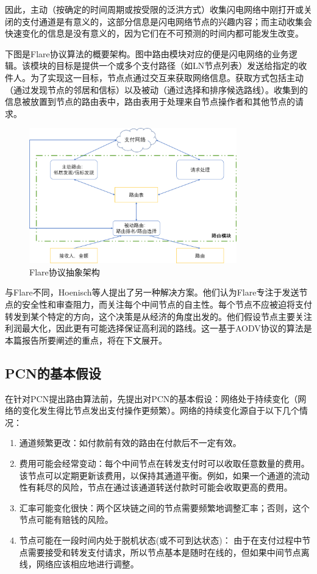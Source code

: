 \documentclass[12pt,a4paper]{article}
\begin{document}
因此，主动（按确定的时间周期或按受限的泛洪方式）收集闪电网络中刚打开或关闭的支付通道是有意义的，这部分信息是闪电网络节点的兴趣内容；而主动收集会快速变化的信息是没有意义的，因为它们在不可预测的时间内都可能发生改变。

下图是Flare协议算法的概要架构。图中路由模块对应的便是闪电网络的业务逻辑。该模块的目标是提供一个或多个支付路径（如LN节点列表）发送给指定的收件人。为了实现这一目标，节点点通过交互来获取网络信息。获取方式包括主动（通过发现节点的邻居和信标）以及被动（通过选择和排序候选路线）。收集到的信息被放置到节点的路由表中，路由表用于处理来自节点操作者和其他节点的请求。

\begin{figure}[htb]
\centering
\includegraphics[width=9cm]{high_level_flare}
\caption{Flare协议抽象架构}
\end{figure}

与Flare不同，Hoenisch等人提出了另一种解决方案\cite{hoenisch2018aodv}。他们认为Flare专注于发送节点的安全性和审查阻力，而\cite{hoenisch2018aodv}关注每个中间节点的自主性。每个节点不应被迫将支付转发到某个特定的方向，这个决策是从经济的角度出发的。他们假设节点主要关注利润最大化，因此更有可能选择保证高利润的路线。这一基于AODV协议的算法是本篇报告所要阐述的重点，将在下文展开。
\subsection{PCN的基本假设}
在针对PCN提出路由算法前，先提出对PCN的基本假设：网络处于持续变化（网络的变化发生得比节点发出支付操作更频繁）。网络的持续变化源自于以下几个情况：
\begin{enumerate}
	\item 通道频繁更改：如付款前有效的路由在付款后不一定有效。
	\item 费用可能会经常变动：每个中间节点在转发支付时可以收取任意数量的费用。该节点可以定期更新该费用，以保持其通道平衡。例如，如果一个通道的流动性有耗尽的风险，节点在通过该通道转送付款时可能会收取更高的费用。
	\item 汇率可能变化很快：两个区块链之间的节点需要频繁地调整汇率；否则，这个节点可能有赔钱的风险。
	\item 节点可能在一段时间内处于脱机状态(或不可到达状态)：
	由于在支付过程中节点需要接受和转发支付请求，所以节点基本是随时在线的，但如果中间节点离线，网络应该相应地进行调整。
\end{enumerate}
\end{document}
